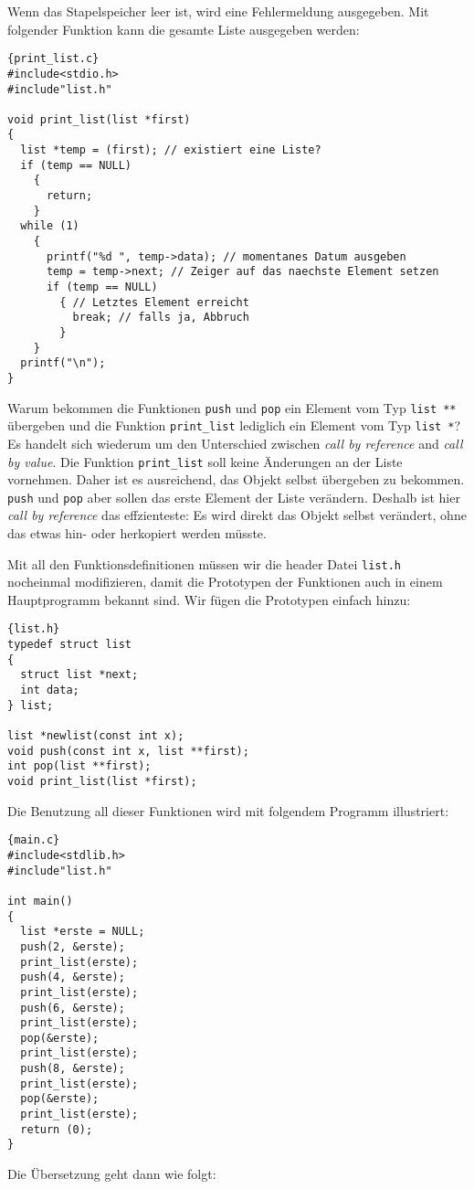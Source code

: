 Wenn das Stapelspeicher leer ist, wird eine Fehlermeldung ausgegeben.
Mit folgender Funktion kann die gesamte Liste ausgegeben werden:
\begin{lstlisting}{print_list.c}
#include<stdio.h>
#include"list.h"

void print_list(list *first)
{
  list *temp = (first); // existiert eine Liste?
  if (temp == NULL)
    {
      return;
    }
  while (1)
    {
      printf("%d ", temp->data); // momentanes Datum ausgeben
      temp = temp->next; // Zeiger auf das naechste Element setzen
      if (temp == NULL)
        { // Letztes Element erreicht
          break; // falls ja, Abbruch
        }
    }
  printf("\n");
}
\end{lstlisting}
Warum bekommen die Funktionen \verb|push| und \verb|pop| ein Element vom Typ \verb|list **| übergeben und die Funktion \verb|print_list| lediglich ein Element vom Typ \verb|list *|?
Es handelt sich wiederum um den Unterschied zwischen \emph{call by reference} and \emph{call by value}.
Die Funktion \verb|print_list| soll keine Änderungen an der Liste vornehmen.
Daher ist es ausreichend, das Objekt selbst übergeben zu bekommen.
\verb|push| und \verb|pop| aber sollen das erste Element der Liste verändern.
Deshalb ist hier \emph{call by reference} das effzienteste: Es wird direkt das Objekt selbst verändert, ohne das etwas hin- oder herkopiert werden müsste.

Mit all den Funktionsdefinitionen müssen wir die header Datei \texttt{list.h} nocheinmal modifizieren, damit die Prototypen der Funktionen auch in einem Hauptprogramm bekannt sind.
Wir fügen die Prototypen einfach hinzu:
\begin{lstlisting}{list.h}
typedef struct list
{
  struct list *next;
  int data;
} list;

list *newlist(const int x);
void push(const int x, list **first);
int pop(list **first);
void print_list(list *first);
\end{lstlisting}


Die Benutzung all dieser Funktionen wird mit folgendem Programm illustriert:
\begin{lstlisting}{main.c}
#include<stdlib.h>
#include"list.h"

int main()
{
  list *erste = NULL;
  push(2, &erste);
  print_list(erste);
  push(4, &erste);
  print_list(erste);
  push(6, &erste);
  print_list(erste);
  pop(&erste);
  print_list(erste);
  push(8, &erste);
  print_list(erste);
  pop(&erste);
  print_list(erste);
  return (0);
}
\end{lstlisting}
Die Übersetzung geht dann wie folgt:

